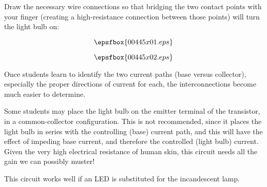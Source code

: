 

Draw the necessary wire connections so that bridging the two contact points with your finger (creating a high-resistance connection between those points) will turn the light bulb on:

\goodbreak

\vskip 40pt

$$\epsfbox{00445x01.eps}$$

\vskip 30pt







$$\epsfbox{00445x02.eps}$$







Once students learn to identify the two current paths (base versus collector), especially the proper directions of current for each, the interconnections become much easier to determine.

Some students may place the light bulb on the emitter terminal of the transistor, in a common-collector configuration.  This is not recommended, since it places the light bulb in series with the controlling (base) current path, and this will have the effect of impeding base current, and therefore the controlled (light bulb) current.  Given the very high electrical resistance of human skin, this circuit needs all the gain we can possibly muster! 

This circuit works well if an LED is substituted for the incandescent lamp.




